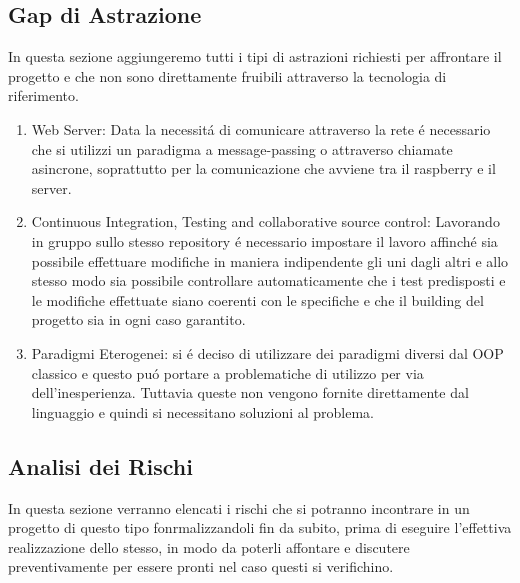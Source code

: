 \subsection{Gap di Astrazione}

In questa sezione aggiungeremo tutti i tipi di astrazioni richiesti per affrontare il progetto e che non sono direttamente fruibili attraverso la tecnologia di riferimento.

\begin{enumerate}
  \item Web Server: Data la necessit\'a di comunicare attraverso la rete \'e necessario che si utilizzi un paradigma a message-passing o attraverso chiamate asincrone, soprattutto per la comunicazione che avviene tra il raspberry e il server.
  \item Continuous Integration, Testing and collaborative source control: Lavorando in gruppo sullo stesso repository \'e necessario impostare il lavoro affinch\'e sia possibile effettuare modifiche in maniera indipendente gli uni dagli altri e allo stesso modo sia possibile controllare automaticamente che i test predisposti e le modifiche effettuate siano coerenti con le specifiche e che il building del progetto sia in ogni caso garantito.
  \item{Paradigmi Eterogenei}: si \'e deciso di utilizzare dei paradigmi diversi dal OOP classico e questo pu\'o portare a problematiche di utilizzo per via dell'inesperienza. Tuttavia queste non vengono fornite direttamente dal linguaggio e quindi si necessitano soluzioni al problema.
\end{enumerate}

\subsection{Analisi dei Rischi}

In questa sezione verranno elencati i rischi che si potranno incontrare in un progetto di questo tipo fonrmalizzandoli fin da subito, prima di eseguire l'effettiva realizzazione dello stesso, in modo da poterli affontare e discutere preventivamente per essere pronti nel caso questi si verifichino.


